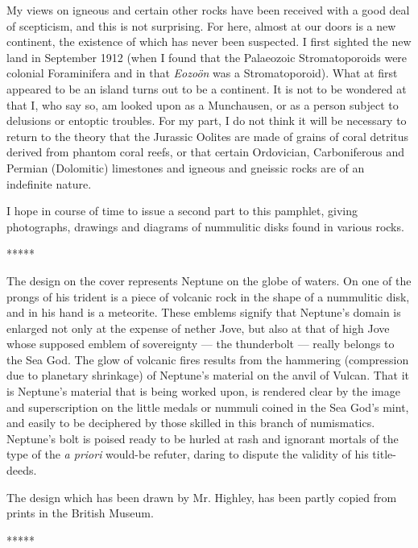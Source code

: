 \documentclass[a4paper, 12pt, oneside]{article}
\begin{document}
My views on igneous and certain other rocks have been received with a good deal of scepticism, and this is not surprising. For here, almost at our doors is a new continent, the existence of which has never been suspected. I first sighted the new land in September 1912 (when I found that the Palaeozoic Stromatoporoids were colonial Foraminifera and in that \emph{Eozoön} was a Stromatoporoid). What at first appeared to be an island turns out to be a continent. It is not to be wondered at that I, who say so, am looked upon as a Munchausen, or as a person subject to delusions or entoptic troubles. For my part, I do not think it will be necessary to return to the theory that the Jurassic Oolites are made of grains of coral detritus derived from phantom coral reefs, or that certain Ordovician, Carboniferous and Permian (Dolomitic) limestones and igneous and gneissic rocks are of an indefinite nature.

I hope in course of time to issue a second part to this pamphlet, giving photographs, drawings and diagrams of nummulitic disks found in various rocks.

\centerline{*\hspace{15mm}*\hspace{15mm}*\hspace{15mm}*\hspace{15mm}*}
\bigskip

The design on the cover represents Neptune on the globe of waters. On one of the prongs of his trident is a piece of volcanic rock in the shape of a nummulitic disk, and in his hand is a meteorite. These emblems signify that Neptune's domain is enlarged not only at the expense of nether Jove, but also at that of high Jove whose supposed emblem of sovereignty --- the thunderbolt --- really belongs to the Sea God. The glow of volcanic fires results from the hammering (compression due to planetary shrinkage) of Neptune's material on the anvil of Vulcan. That it is Neptune's material that is being worked upon, is rendered clear by the image and superscription on the little medals or nummuli coined in the Sea God's mint, and easily to be deciphered by those skilled in this branch of numismatics. Neptune's bolt is poised ready to be hurled at rash and ignorant mortals of the type of the \emph{a priori} would-be refuter, daring to dispute the validity of his title-deeds.

The design which has been drawn by Mr. Highley, has been partly copied from prints in the British Museum.

\centerline{*\hspace{15mm}*\hspace{15mm}*\hspace{15mm}*\hspace{15mm}*}
\bigskip
\end{document}

